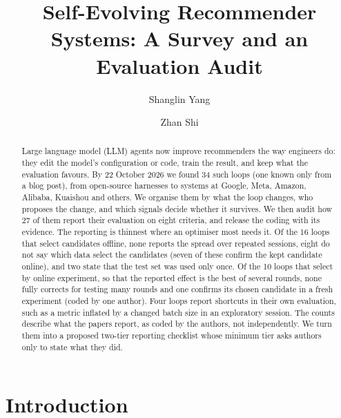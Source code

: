 \documentclass[sigconf,nonacm]{acmart}
\begin{document}
\title{Self-Evolving Recommender Systems: A Survey and an Evaluation Audit}

\author{Shanglin Yang}

\author{Zhan Shi}

\begin{abstract}
Large language model (LLM) agents now improve recommenders the way engineers do: they edit the model's configuration
or code, train the result, and keep what the evaluation favours. By 22 October 2026 we found 34 such loops (one known only from a blog post), from
open-source harnesses to systems at Google, Meta, Amazon, Alibaba, Kuaishou and others. We organise them by what the
loop changes, who proposes the change, and which signals decide whether it survives. We then audit how 27 of them
report their evaluation on eight criteria, and release the coding with its evidence. The reporting is thinnest where
an optimiser most needs it. Of the 16 loops that select candidates offline, none reports the spread over repeated
sessions, eight do not say which data select the candidates (seven of these confirm the kept candidate online), and two state that the test set was used only once. Of
the 10 loops that select by online experiment, so that the reported effect is the best of several rounds, none fully
corrects for testing many rounds and one confirms its chosen candidate in a fresh experiment (coded by one author). Four loops report shortcuts in their own evaluation, such as a metric inflated
by a changed batch size in an exploratory session. The counts describe what the papers report, as coded by the authors, not independently. We turn them into a
proposed two-tier reporting checklist whose minimum tier asks authors only to state what they did.
\end{abstract}


\maketitle

\section{Introduction}
\end{document}
